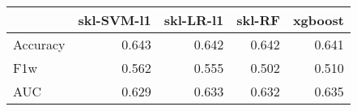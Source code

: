 \begin{tabular}{lrrrr}
\toprule
{} &  skl-SVM-l1 &  skl-LR-l1 &  skl-RF &  xgboost \\
\midrule
Accuracy &       0.643 &      0.642 &   0.642 &    0.641 \\
F1w      &       0.562 &      0.555 &   0.502 &    0.510 \\
AUC      &       0.629 &      0.633 &   0.632 &    0.635 \\
\bottomrule
\end{tabular}
